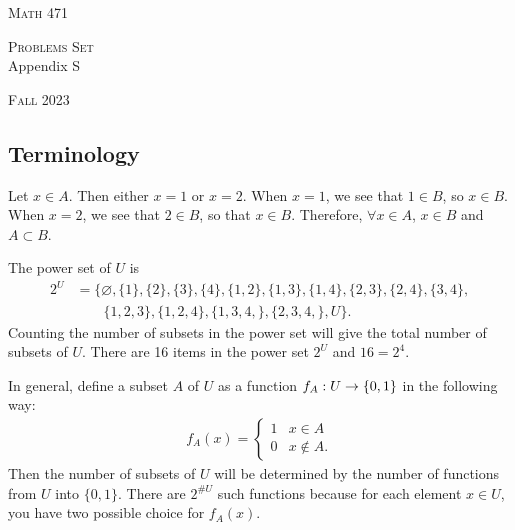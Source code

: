 


\hrulefill

\begin{minipage}{0.33\textwidth}
\textsc{Math 471}
\end{minipage} \hfill 
\begin{minipage}{0.32\textwidth}
\centering
\textsc{Problems Set} \\
Appendix S
\end{minipage}
 \hfill 
 \begin{minipage}{0.33\textwidth}
 \flushright \textsc{Fall 2023}
 \end{minipage}

\hrulefill

\setcounter{section}{19}

\subsection{Terminology}

\begin{problem}
Let $x \in A$. Then either $x = 1$ or $x = 2$. When $x = 1$, we see that $1 \in B$, so $x \in B$. When $x = 2$, we see that $2 \in B$, so that $x \in B$. Therefore, $\forall x \in A$, $x \in B$ and $A \subset B$.
\end{problem}

\begin{problem}
The power set of $U$ is 
\begin{align*}
2^U &= \{ \varnothing , \{ 1 \} , \{ 2 \} , \{ 3 \} , \{4 \} , \{ 1 , 2\} , \{ 1 , 3\} , \{ 1 , 4 \} , \{ 2 , 3\} , \{ 2, 4\} , \{ 3 , 4 \} , \\
& \phantom{=} \, \, \, \,  \{ 1 , 2, 3 \} , \{ 1 , 2, 4 \} , \{ 1 , 3 , 4, \} , \{ 2 , 3, 4, \} , U \} .
\end{align*}
Counting the number of subsets in the power set will give the total number of subsets of $U$. There are 16 items in the power set $2^U$ and $16 = 2^4$.

In general, define a subset $A$ of $U$ as a function $f_A : U \rightarrow \{ 0 , 1\}$ in the following way:
    \begin{align*}
    f_A (x) = \left\{ \begin{matrix}
    1 & x \in A \\
    0 & x \not\in A .\end{matrix} \right. 
    \end{align*} 
Then the number of subsets of $U$ will be determined by the number of functions from $U$ into $\{ 0 , 1\}$. There are $2^{\#U}$ such functions because for each element $x \in U$, you have two possible choice for $f_A (x)$.
\end{problem}

